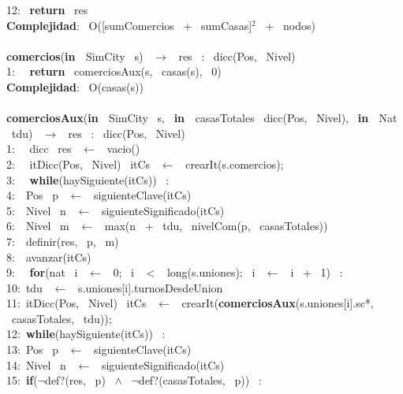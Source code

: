 \begin{Algoritmos}
    12: \ \textbf{return} \ res\\
    \textbf{Complejidad}: \ O([sumComercios \ + \ sumCasas]$^2$ \ + \ nodos)\\
    \noindent\makebox[\linewidth]{\rule{\textwidth}{0.4pt}}
    \\
    \noindent\makebox[\linewidth]{\rule{\textwidth}{0.4pt}}
    \textbf{comercios}(\textbf{in \ }SimCity \ s) \ $\rightarrow $ \ res \ : \ dicc(Pos, \ Nivel)\\
    1: \  \ \textbf{return} \ comerciosAux(s, \ casas(s), \ 0)\\
    \textbf{Complejidad}: \ O(casas(s))\\
    \\
    \textbf{comerciosAux}(\textbf{in \ }SimCity \ s, \ \textbf{in \ }casasTotales \ dicc(Pos, \ Nivel), \ \textbf{in \ }Nat \ tdu) \ $\rightarrow $ \ res \ : \ dicc(Pos, \ Nivel)\\
    1: \  \ dicc \ res \ $\leftarrow$ \ vacio()\\
    2: \  \ itDicc(Pos, \ Nivel) \ itCs \ $\leftarrow$ \ crearIt(s.comercios);\\
    3: \  \ \textbf{while}(haySiguiente(itCs)) \ :\\
    4:\indent  \  \ Pos \ p \ $\leftarrow$ \ siguienteClave(itCs)\\
    5:\indent  \  \ Nivel \ n \ $\leftarrow$ \ siguienteSignificado(itCs)\\
    6:\indent  \  \ Nivel \ m \ $\leftarrow$ \ max(n \ + \ tdu, \ nivelCom(p, \ casasTotales))\\
    7:\indent  \  \ definir(res, \ p, \ m)\\
    8:\indent  \  \ avanzar(itCs)\\
    9: \  \ \textbf{for}(nat \ i \ $\leftarrow$ \ 0; \ i \ $<$ \ long(s.uniones); \ i \ $\leftarrow$ \ i \ + \ 1) \ : \ \\
    10:\indent  \ tdu \ $\leftarrow$ \ s.uniones[i].turnosDesdeUnion\\
    11:\indent  \ itDicc(Pos, \ Nivel) \ itCs \ $\leftarrow$ \ crearIt(\textbf{comerciosAux}(s.uniones[i].sc*, \ casasTotales, \ tdu));\\
    12:\indent  \ \textbf{while}(haySiguiente(itCs)) \ :\\
    13:\indent \indent  \ Pos \ p \ $\leftarrow$ \ siguienteClave(itCs)\\
    14:\indent \indent  \ Nivel \ n \ $\leftarrow$ \ siguienteSignificado(itCs)\\
    15:\indent \indent  \ \textbf{if}($\neg$def?(res, \ p) \ $\wedge$ \ $\neg$def?(casasTotales, \ p)) \ :\\

\end{Algoritmos}
